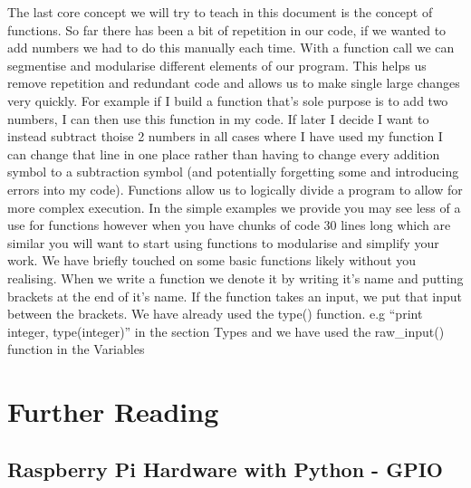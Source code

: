 \documentclass[twocolumn]{article}
\begin{document}
The last core concept we will try to teach in this document is the concept of functions. So far there has been a bit of repetition in our code, if we wanted to add numbers we had to do this manually each time. With a function call we can segmentise and modularise different elements of our program. This helps us remove repetition and redundant code and allows us to make single large changes very quickly. For example if I build a function that's sole purpose is to add two numbers, I can then use this function in my code. If later I decide I want to instead subtract thoise 2 numbers in all cases where I have used my function I can change that line in one place rather than having to change every addition symbol to a subtraction symbol (and potentially forgetting some and introducing errors into my code). Functions allow us to logically divide a program to allow for more complex execution. In the simple examples we provide you may see less of a use for functions however when you have chunks of code 30 lines long which are similar you will want to start using functions to modularise and simplify your work. We have briefly touched on some basic functions likely without you realising. When we write a function we denote it by writing it's name and putting brackets at the end of it's name. If the function takes an input, we put that input between the brackets. We have already used the type() function. e.g ``print integer, type(integer)'' in the section Types and we have used the raw\_input() function in the Variables

\section{Further Reading}

\subsection{Raspberry Pi Hardware with Python - GPIO}
\end{document}
